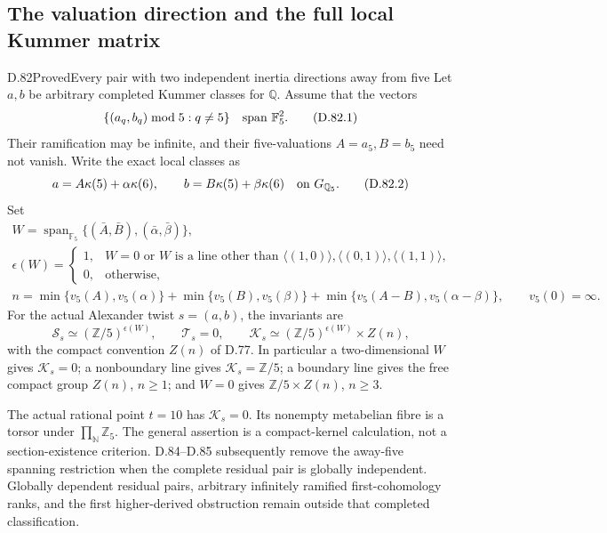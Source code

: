 \subsection{The valuation direction and the full local Kummer matrix}

\begin{statement}{D.82}{Proved}{Every pair with two independent inertia directions away from five}
Let \(a,b\) be arbitrary completed Kummer classes for \(\mathbb Q\).
Assume that the vectors
\[
             \{(a_q,b_q)\bmod5:q\ne5\}
                         \quad\hbox{span }\mathbb F_5^2.
                                                               \tag{D.82.1}
\]
Their ramification may be infinite, and their five-valuations
\(A=a_5,B=b_5\) need not vanish. Write the exact local classes as
\[
 a=A\kappa(5)+\alpha\kappa(6),\qquad
 b=B\kappa(5)+\beta\kappa(6)
                         \quad\hbox{on }G_{\mathbb Q_5}.
                                                               \tag{D.82.2}
\]
Set
\[
 \begin{gathered}
 W=\operatorname{span}_{\mathbb F_5}
       \{(\bar A,\bar B),(\bar\alpha,\bar\beta)\},\\
 \epsilon(W)=
 \begin{cases}
  1,&W=0\text{ or }W\text{ is a line other than }
       \langle(1,0)\rangle,\langle(0,1)\rangle,\langle(1,1)\rangle,\\
  0,&\text{otherwise},
 \end{cases}\\
 n=\min\{v_5(A),v_5(\alpha)\}
   +\min\{v_5(B),v_5(\beta)\}
   +\min\{v_5(A-B),v_5(\alpha-\beta)\},
 \qquad v_5(0)=\infty .
 \end{gathered}                                               \tag{D.82.3}
\]
For the actual Alexander twist \(s=(a,b)\), the invariants are
\[
 \mathcal S_s\simeq(\mathbb Z/5)^{\epsilon(W)},\qquad
 \mathcal T_s=0,\qquad
 \mathcal K_s\simeq(\mathbb Z/5)^{\epsilon(W)}\times Z(n),
                                                               \tag{D.82.4}
\]
with the compact convention \(Z(n)\) of D.77.
In particular a two-dimensional \(W\) gives
\(\mathcal K_s=0\); a nonboundary line gives
\(\mathcal K_s=\mathbb Z/5\); a boundary line gives the free
compact group \(Z(n)\), \(n\ge1\); and \(W=0\) gives
\(\mathbb Z/5\times Z(n)\), \(n\ge3\).

The actual rational point \(t=10\) has \(\mathcal K_s=0\).
Its nonempty metabelian fibre is a torsor under
\(\prod_{\mathbb N}\mathbb Z_5\).
The general assertion is a compact-kernel calculation,
not a section-existence criterion. D.84--D.85 subsequently remove the away-five spanning
restriction when the complete residual pair is globally independent.
Globally dependent residual pairs, arbitrary infinitely ramified
first-cohomology ranks, and the first higher-derived obstruction
remain outside that completed classification.
\end{statement}

